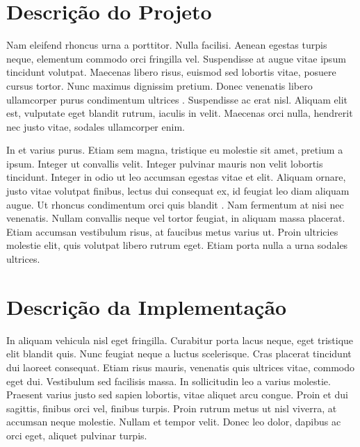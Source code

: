 \documentclass[12pt]{article}
\begin{document}

\section{Descrição do Projeto}

Nam eleifend rhoncus urna a porttitor. Nulla facilisi. Aenean egestas turpis neque, elementum commodo orci fringilla vel. Suspendisse at augue vitae ipsum tincidunt volutpat. Maecenas libero risus, euismod sed lobortis vitae, posuere cursus tortor. Nunc maximus dignissim pretium. Donec venenatis libero ullamcorper purus condimentum ultrices \cite{knuth:84}. Suspendisse ac erat nisl. Aliquam elit est, vulputate eget blandit rutrum, iaculis in velit. Maecenas orci nulla, hendrerit nec justo vitae, sodales ullamcorper enim.

In et varius purus. Etiam sem magna, tristique eu molestie sit amet, pretium a ipsum. Integer ut convallis velit. Integer pulvinar mauris non velit lobortis tincidunt. Integer in odio ut leo accumsan egestas vitae et elit. Aliquam ornare, justo vitae volutpat finibus, lectus dui consequat ex, id feugiat leo diam aliquam augue. Ut rhoncus condimentum orci quis blandit \cite{cormen:09}. Nam fermentum at nisi nec venenatis. Nullam convallis neque vel tortor feugiat, in aliquam massa placerat. Etiam accumsan vestibulum risus, at faucibus metus varius ut. Proin ultricies molestie elit, quis volutpat libero rutrum eget. Etiam porta nulla a urna sodales ultrices.





\section{Descrição da Implementação}

In aliquam vehicula nisl eget fringilla. Curabitur porta lacus neque, eget tristique elit blandit quis. Nunc feugiat neque a luctus scelerisque. Cras placerat tincidunt dui laoreet consequat. Etiam risus mauris, venenatis quis ultrices vitae, commodo eget dui. Vestibulum sed facilisis massa. In sollicitudin leo a varius molestie. Praesent varius justo sed sapien lobortis, vitae aliquet arcu congue. Proin et dui sagittis, finibus orci vel, finibus turpis. Proin rutrum metus ut nisl viverra, at accumsan neque molestie. Nullam et tempor velit. Donec leo dolor, dapibus ac orci eget, aliquet pulvinar turpis.
\end{document}

